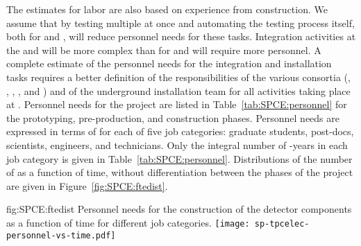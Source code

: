 The estimates for labor are also based on 
experience from  construction. We assume that by testing multiple 
at once and automating the testing process itself,
both for  and , will reduce personnel needs for these tasks. 
Integration activities at the  and 
will be more complex than for  and
will require more personnel. A complete estimate of the
personnel needs for the integration and installation tasks
requires a better definition of the responsibilities of
the various consortia (, , ,
, and ) and of the underground
installation team for all activities taking place
at . Personnel needs for the project are listed in
Table~\ref{tab:SPCE:personnel} for the prototyping,
pre-production, and construction phases. Personnel
needs are expressed in terms of 
for each of five job categories: graduate students,
post-docs, scientists, engineers, and technicians. Only the
integral number of -years in each job category is given
in Table~\ref{tab:SPCE:personnel}. Distributions of the number of  as
a function of time, without differentiation between the
phases of the project are given in Figure~\ref{fig:SPCE:ftedist}.

\begin{dunefigure}
{fig:SPCE:ftedist}
{Personnel needs for the construction of the  detector components 
as a function of time for different job categories.}
\texttt{[image: sp-tpcelec-personnel-vs-time.pdf]}
\end{dunefigure}


